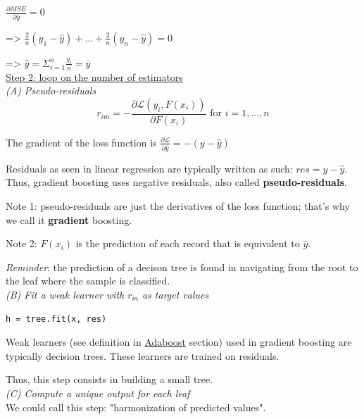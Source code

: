 $\frac{\partial MSE}{\partial \hat y} = 0$

=> $\frac{2}{n}(y_1 - \hat y) + ... + \frac{2}{n}(y_n - \hat y) = 0$

=> $\hat y = \Sigma_{i=1}^n \frac{y_i}{n} = \bar y$ \\

\underline{Step 2: loop on the number of estimators} \\

\textit{(A) Pseudo-residuals} \\

$$r_{im} = - \frac{\partial \mathcal{L}(y_i, F(x_i))}{\partial F(x_i)} \text{ for } i=1,...,n$$

The gradient of the loss function is $\frac{\partial \mathcal{L}}{\partial \hat y} = -(y - \hat y)$

Residuals as seen in linear regression are typically written as such: $res = y - \hat y$. Thus, gradient boosting uses negative residuals, also called \textbf{pseudo-residuals}. 

Note 1: pseudo-residuals are just the derivatives of the loss function; that's why we call it \textbf{gradient} boosting.

Note 2: $F(x_i)$ is the prediction of each record that is equivalent to $\hat y$.

\textit{Reminder}:  the prediction of a decison tree is found in navigating from the root to the leaf where the sample is classified.  \\

\textit{(B) Fit a weak learner with $r_m$ as target values} \\

\lstset{language=Python}
\lstset{frame=lines}
\lstset{basicstyle=\footnotesize}
\begin{lstlisting}
h = tree.fit(x, res)
\end{lstlisting}

Weak learners (see definition in \hyperref[sec:adaboost]{Adaboost} section) used in gradient boosting are typically decision trees. These learners are trained on residuals. 

Thus, this step consists in building a small tree. \\

\textit{(C) Compute a unique output for each leaf} \\

We could call this step: "harmonization of predicted values". \\

